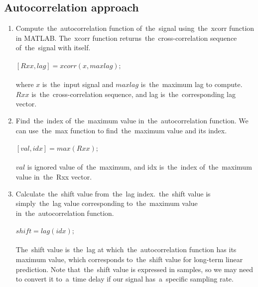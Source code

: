         \subsection{Autocorrelation approach} \label{subsec:acorr}
        \begin{enumerate}
            \item Compute~the~autocorrelation function of~the~signal using~the~xcorr function in MATLAB.
           The~xcorr function returns~the~cross-correlation sequence of~the~signal with itself.\\
            \\
            $[Rxx, lag] = xcorr(x, maxlag);$\\
            \\
            where $x$ is~the~input signal and $maxlag$ is~the~maximum lag to compute. $Rxx$ is~the~cross-correlation
            sequence, and lag is~the~corresponding lag vector.
            \item Find~the~index of~the~maximum value in~the~autocorrelation function. We can use~the~max function to
            find~the~maximum value and its index.\\
            \\
            $[val, idx] = max(Rxx);$\\
            \\
            $val$ is ignored value of~the~maximum, and idx is~the~index of~the~maximum value in~the~Rxx vector.
            \item Calculate~the~shift value from~the~lag index.~the~shift value is simply~the~lag value
            corresponding to~the~maximum value in~the~autocorrelation function.\\
            \\
            $shift = lag(idx);$\\
            \\
           The~shift value is~the~lag at which~the~autocorrelation function has its maximum value, which
            corresponds to~the~shift value for long-term linear prediction. Note that~the~shift value is expressed in
            samples, so we may need to convert it to~a~time delay if our signal has~a~specific sampling rate.
        \end{enumerate}
